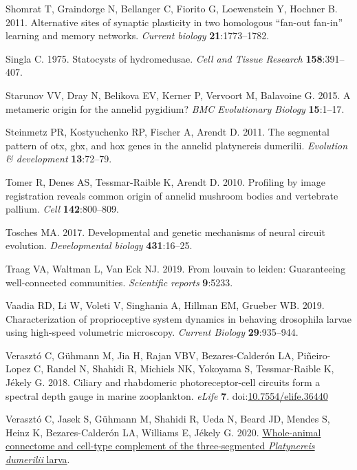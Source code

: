 \documentclass[
  11pt,
]{article}
\newlength{\cslhangindent}
\newenvironment{CSLReferences}[2] %
 {\begin{list}{}{%
  \setlength{\itemindent}{0pt}
  \setlength{\leftmargin}{0pt}
  \setlength{\parsep}{0pt}
  \ifodd #1
   \setlength{\leftmargin}{\cslhangindent}
   \setlength{\itemindent}{-1\cslhangindent}
  \fi
  \setlength{\itemsep}{#2\baselineskip}}}
 {\end{list}}
\begin{document}
\begin{CSLReferences}{1}{0}
Shomrat T, Graindorge N, Bellanger C, Fiorito G, Loewenstein Y, Hochner
B. 2011. Alternative sites of synaptic plasticity in two homologous
{``fan-out fan-in''} learning and memory networks. \emph{Current
biology} \textbf{21}:1773--1782.

Singla C. 1975. Statocysts of hydromedusae. \emph{Cell and Tissue
Research} \textbf{158}:391--407.

Starunov VV, Dray N, Belikova EV, Kerner P, Vervoort M, Balavoine G.
2015. A metameric origin for the annelid pygidium? \emph{BMC
Evolutionary Biology} \textbf{15}:1--17.

Steinmetz PR, Kostyuchenko RP, Fischer A, Arendt D. 2011. The segmental
pattern of otx, gbx, and hox genes in the annelid platynereis dumerilii.
\emph{Evolution \& development} \textbf{13}:72--79.

Tomer R, Denes AS, Tessmar-Raible K, Arendt D. 2010. Profiling by image
registration reveals common origin of annelid mushroom bodies and
vertebrate pallium. \emph{Cell} \textbf{142}:800--809.

Tosches MA. 2017. Developmental and genetic mechanisms of neural circuit
evolution. \emph{Developmental biology} \textbf{431}:16--25.

Traag VA, Waltman L, Van Eck NJ. 2019. From louvain to leiden:
Guaranteeing well-connected communities. \emph{Scientific reports}
\textbf{9}:5233.

Vaadia RD, Li W, Voleti V, Singhania A, Hillman EM, Grueber WB. 2019.
Characterization of proprioceptive system dynamics in behaving
drosophila larvae using high-speed volumetric microscopy. \emph{Current
Biology} \textbf{29}:935--944.

Verasztó C, Gühmann M, Jia H, Rajan VBV, Bezares-Calderón LA,
Piñeiro-Lopez C, Randel N, Shahidi R, Michiels NK, Yokoyama S,
Tessmar-Raible K, Jékely G. 2018. Ciliary and rhabdomeric
photoreceptor-cell circuits form a spectral depth gauge in marine
zooplankton. \emph{eLife} \textbf{7}.
doi:\href{https://doi.org/10.7554/elife.36440}{10.7554/elife.36440}

Verasztó C, Jasek S, Gühmann M, Shahidi R, Ueda N, Beard JD, Mendes S,
Heinz K, Bezares-Calderón LA, Williams E, Jékely G. 2020.
\href{http://dx.doi.org/10.1101/2020.08.21.260984}{Whole-animal
connectome and cell-type complement of the three-segmented
{\emph{Platynereis dumerilii}} larva}.


\end{CSLReferences}
\end{document}
